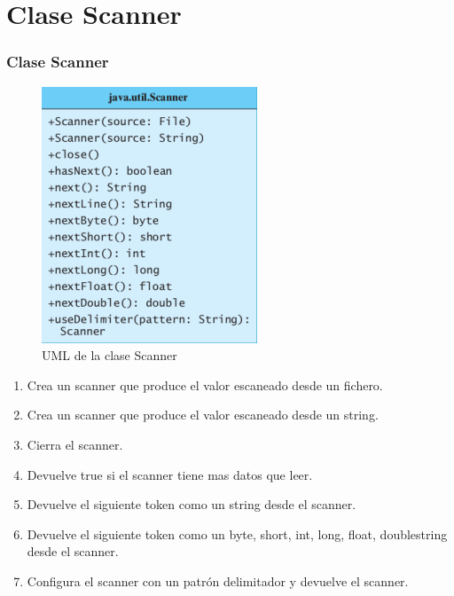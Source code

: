 \documentclass{beamer}
\begin{document}
\section{Clase Scanner}
\begin{frame}
\frametitle{Clase Scanner}

\begin{multicols}{2}
\begin{figure}
\includegraphics[scale=0.55]{imagenes/scanner.png} 
\caption{UML de la clase Scanner}
\end{figure} 
\begin{small}
\begin{enumerate}[<+-| alert@+>]
      \item Crea un scanner que produce el valor escaneado desde un fichero.
      \item Crea un scanner que produce el valor escaneado desde un string.
      \item Cierra el scanner.
      \item Devuelve true si el scanner tiene mas datos que leer.
      \item Devuelve el siguiente token como un string desde el scanner.
      \item Devuelve el siguiente token como un byte, short, int, long, float, doublestring desde el scanner.
      \item Configura el scanner con un patrón delimitador y devuelve el scanner.
      \end{enumerate}
\end{small}
\end{multicols}  
\pause
\end{frame}
\end{document}
